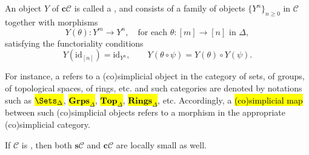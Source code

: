 \begin{definition}
\begin{enumerate}
        An object $Y$ of $\mathbf{c}\mathcal{C}$ is called a , and consists of a family of objects $\{Y^n\}_{n \ge 0}$ in $\mathcal{C}$ together with morphisms
        $$
        Y(\theta) : Y^m \to Y^n, \quad \text{for each } \theta : [m] \to [n] \text{ in } \Delta,
        $$
        satisfying the functoriality conditions
        $$
        Y(\mathrm{id}_{[n]}) = \mathrm{id}_{Y^n}, \qquad Y(\theta \circ \psi) = Y(\theta) \circ Y(\psi).
        $$
    \end{enumerate}
For instance, a  refers to a (co)simplicial object in the category of sets, of groups, of topological spaces, of rings, etc. and such categories are denoted by notations such as \hl{$\Sets_\Delta$}, \hl{$\mathbf{Grps}_\Delta$}, \hl{$\mathbf{Top}_\Delta$}, \hl{$\mathbf{Rings}_\Delta$}, etc. Accordingly, a \hl{(co)simplicial map} between such (co)simplicial objects refers to a morphism in the appropriate (co)simplicial category.

If $\mathcal{C}$ is , then both $\mathbf{s}\mathcal{C}$ and $\mathbf{c}\mathcal{C}$ are locally small as well.
\end{definition}